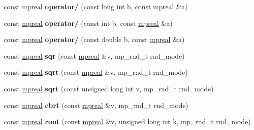 \begin{DoxyCompactItemize}
const \hyperlink{classmpfr_1_1mpreal}{mpreal} {\bfseries operator/} (const long int b, const \hyperlink{classmpfr_1_1mpreal}{mpreal} \&a)
\item 
\mbox{\label{classmpfr_1_1mpreal_add6578941a4a40daa2b63a30b8f1f3ce}} 
const \hyperlink{classmpfr_1_1mpreal}{mpreal} {\bfseries operator/} (const int b, const \hyperlink{classmpfr_1_1mpreal}{mpreal} \&a)
\item 
\mbox{\label{classmpfr_1_1mpreal_a78d18d7f0d69c2f0c5127251965d597f}} 
const \hyperlink{classmpfr_1_1mpreal}{mpreal} {\bfseries operator/} (const double b, const \hyperlink{classmpfr_1_1mpreal}{mpreal} \&a)
\item 
\mbox{\label{classmpfr_1_1mpreal_a91d62cb2564c294a7dc7fd06c078b4f2}} 
const \hyperlink{classmpfr_1_1mpreal}{mpreal} {\bfseries sqr} (const \hyperlink{classmpfr_1_1mpreal}{mpreal} \&v, mp\+\_\+rnd\+\_\+t rnd\+\_\+mode)
\item 
\mbox{\label{classmpfr_1_1mpreal_adeb35721ee07dc6d5cb9f7deae802a1d}} 
const \hyperlink{classmpfr_1_1mpreal}{mpreal} {\bfseries sqrt} (const \hyperlink{classmpfr_1_1mpreal}{mpreal} \&v, mp\+\_\+rnd\+\_\+t rnd\+\_\+mode)
\item 
\mbox{\label{classmpfr_1_1mpreal_a1c0dd1c617cc5d6028fa9d6ea3dd1096}} 
const \hyperlink{classmpfr_1_1mpreal}{mpreal} {\bfseries sqrt} (const unsigned long int v, mp\+\_\+rnd\+\_\+t rnd\+\_\+mode)
\item 
\mbox{\label{classmpfr_1_1mpreal_adc44053b22dc29c6fb6ff603a90d0f63}} 
const \hyperlink{classmpfr_1_1mpreal}{mpreal} {\bfseries cbrt} (const \hyperlink{classmpfr_1_1mpreal}{mpreal} \&v, mp\+\_\+rnd\+\_\+t rnd\+\_\+mode)
\item 
\mbox{\label{classmpfr_1_1mpreal_a4d624802e61878531599ef5e111a1f0a}} 
const \hyperlink{classmpfr_1_1mpreal}{mpreal} {\bfseries root} (const \hyperlink{classmpfr_1_1mpreal}{mpreal} \&v, unsigned long int k, mp\+\_\+rnd\+\_\+t rnd\+\_\+mode)
\item 
\mbox{\label{classmpfr_1_1mpreal_a166ef6e3c4f7f9a79c1bcd96f75d56af}} 

\end{DoxyCompactItemize}
